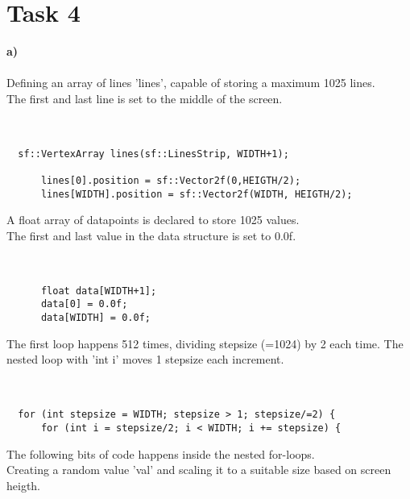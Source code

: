 \documentclass[11pt]{amsart}
\begin{document}
\section{Task 4}

\textbf{a)}\\\\

Defining an array of lines 'lines', capable of storing a maximum 1025 lines. \\
The first and last line is set to the middle of the screen. \\\\

\begin{verbatim}

  sf::VertexArray lines(sf::LinesStrip, WIDTH+1);

      lines[0].position = sf::Vector2f(0,HEIGTH/2);
      lines[WIDTH].position = sf::Vector2f(WIDTH, HEIGTH/2);

\end{verbatim}

A float array of datapoints is declared to store 1025 values. \\

The first and last value in the data structure is set to 0.0f.\\\\

\begin{verbatim}

      float data[WIDTH+1];
      data[0] = 0.0f;
      data[WIDTH] = 0.0f;

\end{verbatim}

The first loop happens 512 times, dividing stepsize (=1024) by 2 each time.
The nested loop with 'int i' moves 1 stepsize each increment. \\\\

\begin{verbatim}

  for (int stepsize = WIDTH; stepsize > 1; stepsize/=2) {
      for (int i = stepsize/2; i < WIDTH; i += stepsize) {

\end{verbatim}

The following bits of code happens inside the nested for-loops. \\

Creating a random value 'val' and scaling it to a suitable size based on screen heigth. \\\\
\end{document}
